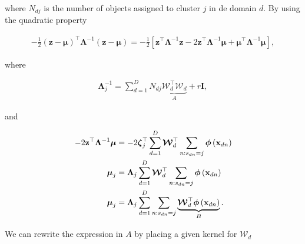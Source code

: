 \documentclass[]{article}
\newcommand{\C}{\boldsymbol{\Lambda}_j}
\newcommand{\muJ}{\boldsymbol{\mu}_j}
\newcommand{\eye}{\mathbf{I}}
\newcommand{\indobj}{\mathbf{x}_{dn}}
\newcommand{\projMat}{\boldsymbol{\mathcal{W}}_d}
\newcommand{\lvec}{\boldsymbol{\zeta}_j}
\newcommand{\phixnd}{\boldsymbol{\phi}\left(\indobj\right)}
\begin{document}
where $N_{dj}$ is the number of objects assigned to cluster $j$ in de domain $d$. By using the quadratic property

\begin{align}
-\frac{1}{2}\left(\mathbf{z}-\boldsymbol{\mu}\right)^\top \boldsymbol{\Lambda}^{-1} \left(\mathbf{z}-\boldsymbol{\mu}\right) = -\frac{1}{2}\left[\mathbf{z}^\top \boldsymbol{\Lambda}^{-1}\mathbf{z} -2\mathbf{z}^\top \boldsymbol{\Lambda}^{-1}\boldsymbol{\mu} + \boldsymbol{\mu}^\top\boldsymbol{\Lambda}^{-1}\boldsymbol{\mu}\right] \label{eq:quadnm},
\end{align}

where 

\begin{align}
\C^{-1} = \sum_{d=1}^{D} N_{dj}\underbrace{\projMat^\top \projMat}_{A} + r\eye,
\end{align}

and

\begin{align}
-2\mathbf{z}^\top \boldsymbol{\Lambda}^{-1}\boldsymbol{\mu} &=  -2 \lvec^\top  \sum_{d=1}^{D}\projMat^\top \sum_{n:s_{dn}=j}\phixnd \notag \\
\muJ &= \C  \sum_{d=1}^{D}\projMat^\top \sum_{n:s_{dn}=j}\phixnd \notag \\
\muJ &= \C  \sum_{d=1}^{D} \sum_{n:s_{dn}=j}\underbrace{ \projMat^\top\phixnd}_{B}.
\end{align}

We can rewrite the expression in $A$ by placing a given kernel for $\projMat$
\end{document}
